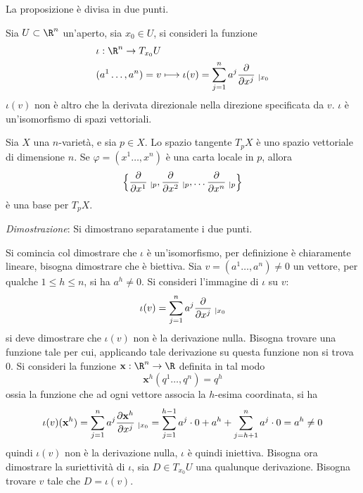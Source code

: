 \documentclass[10pt, letterpaper]{report}
\begin{document}
\begin{proposizione}La proposizione è divisa in due punti.\bigskip

\noindent{} Sia $U\subset\R^n$ un'aperto, sia $x_0\in U$, si consideri la funzione\begin{align}
        &\iota :\R^n\rightarrow T_{x_0}U\\
        &(a^1\dots,a^n)=v\longmapsto \iota(v)=\sum_{j=1}^na^j\frac{\partial}{\partial x^j}\hphantom{.}_{|x_0}
    \end{align}
    $\iota(v)$ non è altro che la derivata direzionale nella direzione specificata da $v$. $\iota$ è un'isomorfismo di spazi vettoriali.\bigskip

    \noindent{} Sia $X$ una $n$-varietà, e sia $p\in X$. Lo spazio tangente $T_pX$ è uno spazio vettoriale di dimensione $n$. Se $\varphi=(x^1\dots,x^n)$ è una carta locale in $p$, allora\begin{equation}
        \Big\{\frac{\partial}{\partial x^1}\hphantom{.}_{|p},
        \frac{\partial}{\partial x^2}\hphantom{.}_{|p},\dots
        \frac{\partial}{\partial x^n}\hphantom{.}_{|p}\Big\}
    \end{equation} 
    è una base per $T_pX$.
\end{proposizione}
\textit{Dimostrazione}: Si dimostrano separatamente i due punti.

\noindent{}Si comincia col dimostrare che $\iota$ è un'isomorfismo, per definizione è chiaramente lineare, bisogna dimostrare che è biettiva. Sia $v=(a^1\dots, a^n)\ne 0$ un vettore, per qualche $1\le h\le n$, si ha $a^h\ne 0$. Si consideri l'immagine di $\iota$ su $v$:\begin{equation}
    \iota(v)=\sum_{j=1}^na^j\frac{\partial}{\partial x^j}\hphantom{.}_{|x_0}
\end{equation}
si deve dimostrare che $\iota(v)$ non è la derivazione nulla. Bisogna trovare una funzione tale per cui, applicando tale derivazione su questa funzione non si trova 0. Si consideri la funzione $\mathbf x:\R^n\rightarrow\R$ definita in tal modo \begin{equation}\label{eq:proiezione}
    \mathbf x^h(q^1\dots,q^n)=q^h
\end{equation}
ossia la funzione che ad ogni vettore associa la $h$-esima coordinata, si ha \begin{equation}
    \iota(v)(\mathbf x^h)=\sum_{j=1}^na^j\frac{\partial \mathbf x^h}{\partial x^j}\hphantom{.}_{|x_0}=\sum_{j=1}^{h-1}a^j\cdot 0+
    a^h
    +
    \sum_{j=h+1}^{n}a^j\cdot 0=a^h\ne 0
\end{equation}
quindi $\iota(v)$ non è la derivazione nulla, $\iota$ è quindi iniettiva. Bisogna ora dimostrare la suriettività di $\iota$, sia $D\in T_{x_0}U$ una qualunque derivazione. Bisogna trovare $v$ tale che $D=\iota(v)$.
\end{document}
